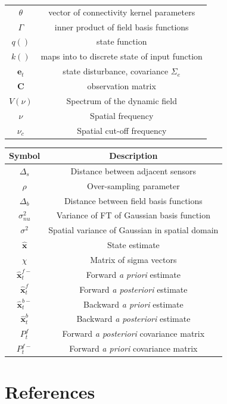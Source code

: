 \documentclass[12pt]{iopart}		%
\begin{document}
\begin{tabular} {c|c}
	$\theta$ & vector of connectivity kernel parameters \\
	$\Gamma$ & inner product of field basis functions \\
	$q()$ & state function \\
	$k()$ & maps into to discrete state of input function \\
	$\mathbf{e}_t$ & state disturbance, covariance $\Sigma_e$ \\
	$\mathbf{C}$ & observation matrix \\
	$V(\nu)$ & Spectrum of the dynamic field \\ 
	$\nu$ & Spatial frequency \\
	$\nu_c$ & Spatial cut-off frequency \\
\end{tabular}

\begin{tabular}{c|c}
	\hline\hline
	Symbol & Description \\ \hline
	$\Delta_s$ & Distance between adjacent sensors \\
	$\rho$ & Over-sampling parameter \\	
	$\Delta_b$ & Distance between field basis functions \\	
	$\sigma_{nu}^2$ & Variance of FT of Gaussian basis function \\
	$\sigma^2$ & Spatial variance of Gaussian in spatial domain \\
	$\hat{\mathbf{x}}$ & State estimate \\
	$\chi$ & Matrix of sigma vectors \\
	$\hat{\mathbf{x}}_t^{f-}$ & Forward \emph{a priori} estimate \\
	$\hat{\mathbf{x}}_t^f$ & Forward \emph{a posteriori} estimate \\
	$\hat{\mathbf{x}}_t^{b-}$ & Backward \emph{a priori} estimate \\
	$\hat{\mathbf{x}}_t^{b}$ & Backward \emph{a posteriori} estimate \\
	$P^f_t$ & Forward \emph{a posteriori} covariance matrix \\
	$P^{f-}_t$ & Forward \emph{a priori} covariance matrix \\	
\end{tabular}
\section*{References}



\end{document}
